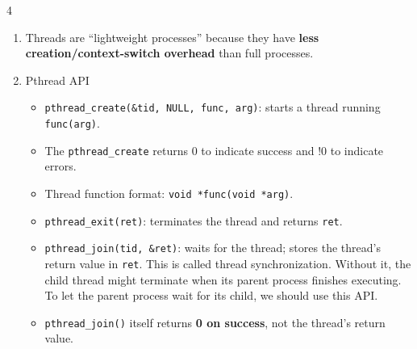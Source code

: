\documentclass[10pt, landscape]{article}
\begin{document}
\begin{multicols}{4}
\begin{enumerate}
    \item Threads are ``lightweight processes'' because they have \textbf{less creation/context-switch overhead} than full processes.
    \item Pthread API
        \begin{itemize}
        \item \texttt{pthread\_create(\&tid, NULL, func, arg)}: starts a thread running \texttt{func(arg)}.
        \item The \texttt{pthread\_create} returns 0 to indicate success and !0 to indicate errors.
        \item Thread function format: \texttt{void *func(void *arg)}.
        \item \texttt{pthread\_exit(ret)}: terminates the thread and returns \texttt{ret}.
        \item \texttt{pthread\_join(tid, \&ret)}: waits for the thread; stores the thread's return value in \texttt{ret}. This is called thread synchronization. Without it, the child thread might terminate when its parent process finishes executing. To let the parent process wait for its child, we should use this API.
        \item \texttt{pthread\_join()} itself returns \textbf{0 on success}, not the thread's return value.
    \end{itemize}
\end{enumerate}


\end{multicols}
\end{document}
